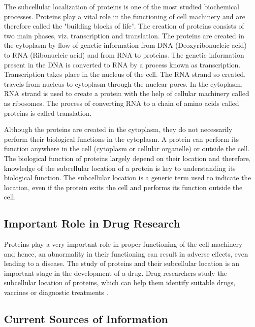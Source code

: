 The subcellular localization of proteins is one of the most studied biochemical processes. Proteins play a vital role in the functioning of cell machinery and are therefore called the "building blocks of life". The creation of proteins consists of two main phases, viz. transcription and translation. The proteins are created in the cytoplasm by flow of genetic information from DNA (Deoxyribonucleic acid) to RNA (Ribonucleic acid) and from RNA to proteins. The genetic information present in the DNA is converted to RNA by a process known as transcription. Transcription takes place in the nucleus of the cell. The RNA strand so created, travels from nucleus to cytoplasm through the nuclear pores. In the cytoplasm, RNA strand is used to create a protein with the help of cellular machinery called as ribosomes. The process of converting RNA to a chain of amino acids called proteins is called translation. 

Although the proteins are created in the cytoplasm, they do not necessarily perform their biological functions in the cytoplasm. A protein can perform its function anywhere in the cell (cytoplasm or cellular organelle) or outside the  cell. The biological function of proteins largely depend on their location and therefore, knowledge of the subcellular location of a protein is key to understanding its biological function. The subcellular location is a generic term used to indicate the location, even if the protein exits the cell and performs its  function outside the cell.

\subsection{Important Role in Drug Research}

Proteins play a very important role in proper functioning of the cell machinery and hence, an abnormality in their functioning can result in adverse effects, even leading to a disease. The study of proteins and their subcellular location is an important stage in the development of a drug. Drug researchers study the subcellular location of proteins, which can help them identify suitable drugs, vaccines or diagnostic treatments \cite{liu2007exploiting}. 


\subsection{Current Sources of Information}


